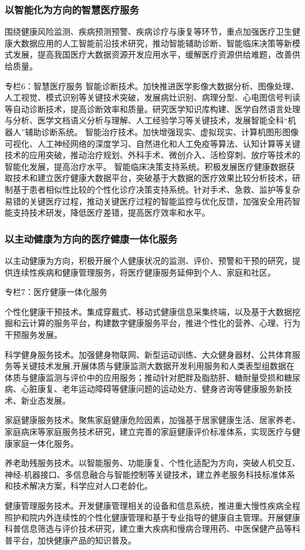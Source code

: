 \documentclass{article}
\begin{document}
\subsubsection{以智能化为方向的智慧医疗服务}

围绕健康风险监测、疾病预测预警、疾病诊疗与康复等环节，重点加强医疗卫生健康大数据应用的人工智能前沿技术研究，推动智能辅助诊断、智能临床决策等新模式发展，提高我国医疗大数据资源开发应用水平，缓解医疗资源供给难题，改善供给质量。

\begin{minipage}{20em}
专栏6：智慧医疗服务
智能诊断技术。加快推进医学影像大数据分析、图像处理、人工视觉、模式识别等关键技术突破，发展病灶识别、病理分型、心电图信号判读等自动诊断技术，提高诊断效率和质量。研究医学知识库构建、医学自然语言处理与分析、医学文档语义分析与理解、人工经验学习等关键技术，发展智能全科“机器人”辅助诊断系统。
智能治疗技术。加快增强现实、虚拟现实、计算机图形图像可视化、人工神经网络的深度学习、自然进化和人工免疫等算法、认知计算等关键技术的应用突破，推动治疗规划、外科手术、微创介入、活检穿刺、放疗等技术的智能化发展，提高治疗水平。
智能临床决策支持系统。积极发展医疗健康数据获取技术和建立医疗健康大数据平台，突破基于大数据的医疗效果比较分析技术，研制基于患者相似性比较的个性化诊疗决策支持系统。针对手术、急救、监护等复杂易错的关键医疗过程，推动关键医疗过程的智能监控与优化反馈，加强安全用药智能支持技术研发，降低医疗差错，提高医疗效率和水平。
\end{minipage}

\subsubsection{以主动健康为方向的医疗健康一体化服务}

以主动健康为方向，积极开展个人健康状况的监测、评价、预警和干预的研究，提供连续性疾病和健康管理服务，将医疗健康服务延伸到个人、家庭和社区。

\begin{minipage}{20em}
专栏7：医疗健康一体化服务

个性化健康干预技术。集成穿戴式、移动式健康信息采集终端，以及基于大数据挖掘和云计算的服务平台，构建数字健康服务平台，推进个性化的营养、心理、行为干预服务发展。

科学健身服务技术。加强健身物联网、新型运动训练、大众健身器材、公共体育服务等关键技术发展,开展体质与健康监测大数据开发利用服务和人类表型组数据在体质与健康监测与评价中的应用服务；推动针对肥胖及脂肪肝、糖耐量受损和糖尿病、心脏康复、老年运动障碍等健康问题的运动处方、健身咨询等健康服务新技术、新业态发展。

家庭健康服务技术。聚焦家庭健康危险因素，加强基于居家健康生活、居家养老、家庭病床等家庭服务技术研究，建立完善的家庭健康评价标准体系，实现医疗与健康家庭一体化服务。

养老助残服务技术。以智能服务、功能康复、个性化适配为方向，突破人机交互、神经-机器接口、多信息融合与智能控制等关键技术，建立养老服务科技标准体系和技术解决方案，科学应对人口老龄化。

健康管理服务技术。开发健康管理相关的设备和信息系统，推进重大慢性疾病全程照护和院内外连续性的个性化健康管理和基于专业指导的健康自主管理。开展健康科普信息筛选与评价技术研究，建立重大疾病和慢病合理用药、中医保健产品等科普平台，加快健康产品的知识普及。
\end{minipage}
\end{document}
